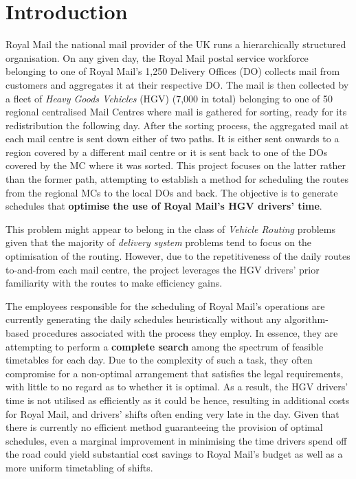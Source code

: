 \chapter{Introduction}

\vspace{\baselineskip}
Royal Mail the national mail provider of the UK runs a hierarchically structured organisation. On any given day, the Royal Mail postal service workforce belonging to one of Royal Mail’s 1,250 Delivery Offices (DO) collects mail from customers and aggregates it at their respective DO. The mail is then collected by a fleet of \textit{Heavy Goods Vehicles} (HGV) (7,000 in total) belonging to one of 50 regional centralised Mail Centres where mail is gathered for sorting, ready for its redistribution the following day. After the sorting process, the aggregated mail at each mail centre is sent down either of two paths. It is either sent onwards to a region covered by a different mail centre or it is sent back to one of the DOs covered by the MC where it was sorted. This project focuses on the latter rather than the former path, attempting to establish a method for scheduling the routes from the regional MCs to the local DOs and back. The objective is to generate schedules that \textbf{optimise the use of Royal Mail’s HGV drivers’ time}.

\vspace{\baselineskip}
\noindent
This problem might appear to belong in the class of \textit{Vehicle Routing }problems given that the majority of \textit{delivery system} problems tend to focus on the optimisation of the routing. However, due to the repetitiveness of the daily routes to-and-from each mail centre, the project leverages the HGV drivers’ prior familiarity with the routes to make efficiency gains.

\vspace{\baselineskip}

\noindent
The employees responsible for the scheduling of Royal Mail’s operations are currently generating the daily schedules heuristically without any algorithm-based procedures associated with the process they employ. In essence, they are attempting to perform a \textbf{complete search} among the spectrum of feasible timetables for each day. Due to the complexity of such a task, they often compromise for a non-optimal arrangement that satisfies the legal requirements, with little to no regard as to whether it is optimal. As a result, the HGV drivers’ time is not utilised as efficiently as it could be hence, resulting in additional costs for Royal Mail, and drivers’ shifts often ending very late in the day. Given that there is currently no efficient method guaranteeing the provision of optimal schedules, even a marginal improvement in minimising the time drivers spend off the road could yield substantial cost savings to Royal Mail’s budget as well as a more uniform timetabling of shifts.

